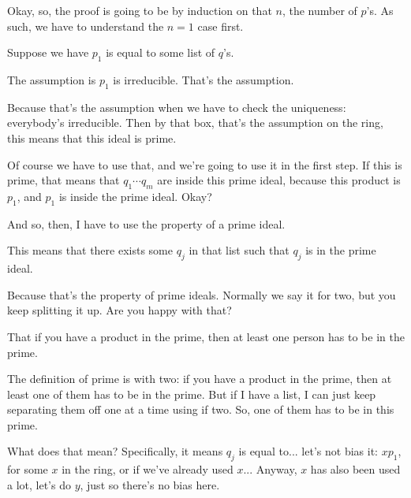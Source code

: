 \begin{proofWrapper}
\begin{speech}[00:36:03 - 00:37:55]
Okay, so, the proof is going to be by induction on that $n$, the number of $p$'s. As such, we have to understand the $n = 1$ case first.

Suppose we have $p_1$ is equal to some list of $q$'s. 

The assumption is $p_1$ is irreducible.  That's the assumption.

Because that's the assumption when we have to check the uniqueness: everybody's irreducible. Then by that box,  that's the assumption on the ring, this means that this ideal  is prime.

Of course we have to use that, and we're going to use it in the first step. If this is prime, that means that $q_1 \cdots q_m$ are inside this prime ideal,  because this product is $p_1$, and $p_1$ is inside the prime ideal. Okay?

And so, then, I have to use the property of a prime ideal.

This means that there exists some $q_j$  in that list such that  $q_j$ is in the prime ideal. 

Because that's the property of prime ideals. Normally we say it for two, but you keep splitting it up. Are you happy with that?

That if you have a product in the prime, then at least one person has to be in the prime.

The definition of prime is with two: if you have a product in the prime, then at least one of them has to be in the prime. But if I have a list, I can just keep separating them off one at a time using if two. So, one of them has to be in this prime.
\end{speech}

\begin{speech}[00:37:55 - 00:39:17]
What does that mean? Specifically, it means $q_j$ is equal to... let's not bias it: $x p_1$,  for some  $x$ in the ring, or if we've already used $x$... Anyway, $x$ has also been used a lot, let's do $y$, just so there's no bias here. 


\end{speech}
\end{proofWrapper}
